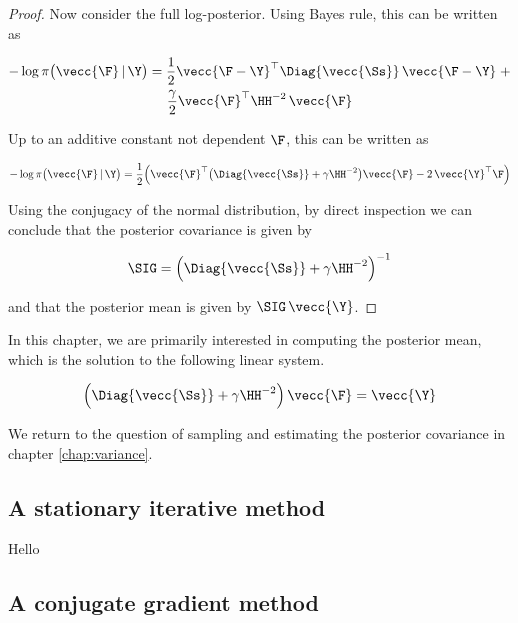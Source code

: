 \begin{proof}
    Now consider the full log-posterior. Using Bayes rule, this can be written as 

    \begin{multline}
        -\log \pi\big(\vecc{\F} \, | \, \Y \big) = \frac{1}{2} \vecc{\F - \Y}^\top \Diag{\vecc{\Ss}} \, \vecc{\F - \Y} \; + \\ \frac{\gamma}{2} \vecc{\F }^\top\HH^{-2} \, \vecc{\F}
    \end{multline}

    Up to an additive constant not dependent $\F$, this can be written as 

    \begin{equation}
        -\log \pi\big(\vecc{\F} \, | \, \Y \big) = \frac{1}{2} \Big( \vecc{\F}^\top \big( \Diag{\vecc{\Ss}} + \gamma \HH^{-2}\big) \vecc{\F} - 2 \, \vecc{\Y}^\top \F \Big)
    \end{equation}

    Using the conjugacy of the normal distribution, by direct inspection we can conclude that the posterior covariance is given by 

    \begin{equation}
        \SIG = \Big( \Diag{\vecc{\Ss}} + \gamma \HH^{-2} \Big)^{-1}
    \end{equation}

    and that the posterior mean is given by $\SIG \, \vecc{\Y}$. 

\end{proof}

In this chapter, we are primarily interested in computing the posterior mean, which is the solution to the following linear system. 

\begin{equation}
    \label{eq:lin_system}
        \Big(\Diag{\vecc{\Ss}} + \gamma  \HH^{-2}\Big) \, \vecc{\F} = \vecc{\Y}
    \end{equation}

We return to the question of sampling and estimating the posterior covariance in chapter \ref{chap:variance}. 


\subsection{A stationary iterative method}

Hello

\subsection{A conjugate gradient method}

